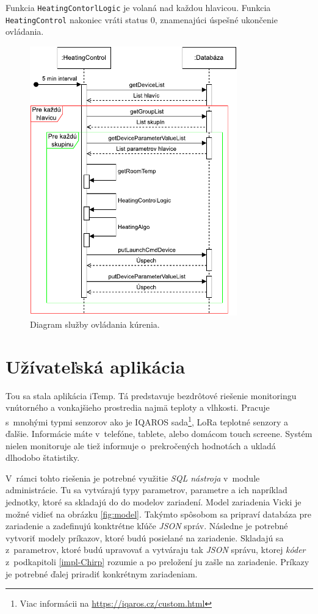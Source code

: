  Funkcia \texttt{HeatingContorlLogic} je volaná nad každou hlavicou.
 Funkcia \texttt{HeatingControl} nakoniec vráti status 0, znamenajúci úspešné ukončenie ovládania.

\begin{figure}[H]
    \centering
    \includegraphics[width=0.8\textwidth]{obrazky-figures/diagram.pdf}
    \caption{Diagram služby ovládania kúrenia.}
    \label{fig:diagram}
\end{figure}

\section{Užívateľská aplikácia}\label{impl-iTemp}
Tou sa stala aplikácia iTemp.
Tá predstavuje bezdrôtové riešenie monitoringu vnútorného a vonkajšieho prostredia najmä teploty a vlhkosti.
Pracuje s~mnohými typmi senzorov ako je IQAROS sada\footnote{Viac informácii na \url{https://iqaros.cz/custom.html}}, LoRa teplotné senzory a ďalšie. 
Informácie máte v~telefóne, tablete, alebo domácom touch screene. Systém nielen monitoruje ale tiež informuje o~prekročených hodnotách a ukladá dlhodobo štatistiky.

V~rámci tohto riešenia je potrebné využitie \emph{SQL nástroja}  v~module administrácie. 
Tu sa vytvárajú typy parametrov, parametre a ich napríklad jednotky, ktoré sa skladajú do do modelov zariadení. Model zariadenia Vicki je možné vidieť na obrázku \ref{fig:model}.
Takýmto spôsobom sa pripraví databáza pre zariadenie a zadefinujú konktrétne kľúče \emph{JSON} správ. 
Následne je potrebné vytvoriť modely príkazov, ktoré budú posielané na zariadenie. 
Skladajú sa z~parametrov, ktoré budú upravovať a vytváraju tak \emph{JSON} správu, ktorej \emph{kóder} z~podkapitoli \ref{impl-Chirp} rozumie a po preložení ju zašle na zariadenie. 
Príkazy je potrebné ďalej priradiť konkrétnym zariadeniam.

